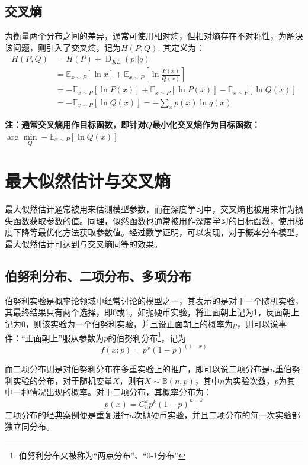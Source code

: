 \documentclass[12pt,a4paper]{article}
\begin{document}
  \subsection{交叉熵}\label{subsec:cross-entropy}

  为衡量两个分布之间的差异，通常可使用相对熵，但相对熵存在不对称性，为解决该问题，则引入了交叉熵，记为$H(P,Q)$. 其定义为：
  \begin{equation}
    \begin{aligned}
      H(P,Q) &= H(P) + \operatorname{D} _{KL} (p||q) \\
      &= \mathbb{E}_{x\sim P}[\ln x] + \mathbb{E}_{x \sim P} \left[\ln \frac{P(x)}{Q(x)}\right] \\ 
      &= -\mathbb{E}_{x\sim P}[\ln P(x)] + \mathbb{E}_{x \sim P} [\ln P(x)] - \mathbb{E}_{x \sim P} [\ln Q(x)] \\ 
      &= - \mathbb{E}_{x \sim P} [\ln Q(x)] = - \sum\limits _x p(x) \ln q(x)
    \end{aligned}
    \label{eq:cross-entropy}
  \end{equation}

  \textbf{注：通常交叉熵用作目标函数，即针对$Q$最小化交叉熵作为目标函数：$\arg\min\limits _Q -\mathbb{E}_{x\sim P}[\ln Q(x)]$}

  \section{最大似然估计与交叉熵}

  最大似然估计通常被用来估测模型参数，而在深度学习中，交叉熵也被用来作为损失函数获取参数的值。同理，似然函数也通常被用作深度学习的目标函数，使用梯度下降等最优化方法获取参数值。经过数学证明，可以发现，对于概率分布模型，最大似然估计可达到与交叉熵同等的效果。

  \subsection{伯努利分布、二项分布、多项分布}\label{subsec:binary-distribution}
  
  伯努利实验是概率论领域中经常讨论的模型之一，其表示的是对于一个随机实验，其最终结果只有两个选择，即0或1。如抛硬币实验，将正面朝上记为1，反面朝上记为0，则该实验为一个伯努利实验，并且设正面朝上的概率为$p$，则可以说事件：“正面朝上”服从参数为$p$的伯努利分布\footnote{伯努利分布又被称为“两点分布”、“0-1分布”}，记为$$f(x;p)=p^x(1-p)^{(1-x)}$$

  而二项分布则是对伯努利分布在多重实验上的推广，即可以说二项分布是$n$重伯努利实验的分布，对于随机变量$X$，则有$X\sim \mathbb{B}(n, p)$，其中$n$为实验次数，$p$为其中一种情况出现的概率。对于二项分布，其概率分布为：
  $$p(x)=C_n^kp^k(1-p)^{n-k}$$
  二项分布的经典案例便是重复进行$n$次抛硬币实验，并且二项分布的每一次实验都独立同分布。
\end{document}
